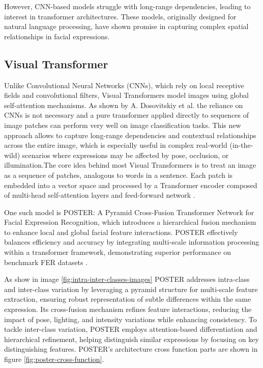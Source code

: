 However, CNN-based models struggle with long-range dependencies, leading to interest in transformer architectures. These models, originally designed for natural language processing, have shown promise in capturing complex spatial relationships in facial expressions. 

\subsection{Visual Transformer}

Unlike Convolutional Neural Networks (CNNs), which rely on local receptive fields and convolutional filters, Visual Transformers model images using global self-attention mechanisms. As shown by A. Dosovitskiy et al. \cite{dosovitskiy_image_2021} the reliance on CNNs is not necessary and a pure transformer applied directly to sequences of image patches can perform very well on image classification tasks. This new approach allows to capture long-range dependencies and contextual relationships across the entire image, which is especially useful in complex real-world (in-the-wild) scenarios \cite{steiner_how_2022}  where expressions may be affected by pose, occlusion, or illumination.The core idea behind most Visual Transformers is to treat an image as a sequence of patches, analogous to words in a sentence. Each patch is embedded into a vector space and processed by a Transformer encoder composed of multi-head self-attention layers and feed-forward network \cite{islam_recent_2023, park_what_2023}. 


One such model is POSTER: A Pyramid Cross-Fusion Transformer Network for Facial Expression Recognition, which introduces a hierarchical fusion mechanism to enhance local and global facial feature interactions. POSTER effectively balances efficiency and accuracy by integrating multi-scale information processing within a transformer framework, demonstrating superior performance on benchmark \gls{FER} datasets \cite{zheng_poster_2022}.

As show in image \ref{fig:intra-inter-classes-images} POSTER addresses \gls{intra-class} and \gls{inter-class} variation by leveraging a pyramid structure for multi-scale feature extraction, ensuring robust representation of subtle differences within the same expression. Its cross-fusion mechanism refines feature interactions, reducing the impact of pose, lighting, and intensity variations while enhancing consistency. To tackle \gls{inter-class} variation, \gls{POSTER} employs attention-based differentiation and hierarchical refinement, helping distinguish similar expressions by focusing on key distinguishing features. POSTER's architecture cross function parts are shown in figure \ref{fig:poster-cross-function}. 


